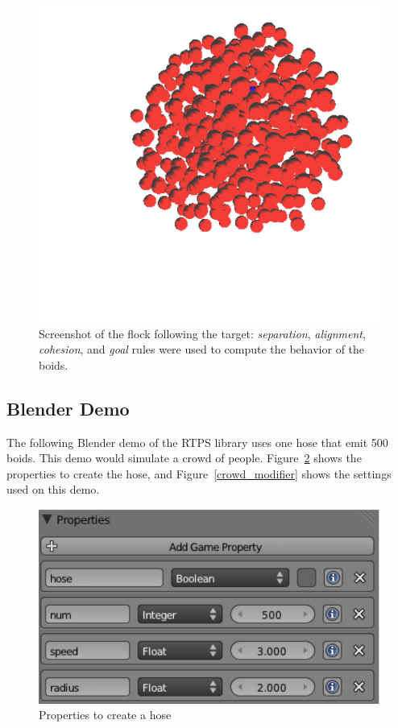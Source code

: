 \begin{figure}[htbp]
\begin{center}
\includegraphics[scale=0.35]{figures/demo_goal_4rules.pdf}
\caption{Screenshot of the flock following the target: \textit{separation}, \textit{alignment}, \textit{cohesion}, and \textit{goal} rules were used to compute the behavior of the boids.}
\label{goal_4rules}
\end{center}
\end{figure}

\subsection{Blender Demo}

The following Blender demo of the RTPS library uses one hose that emit 500 boids. This demo would simulate a crowd of people. Figure~\ref{crowd_prop} shows the properties to create the hose, and Figure~\ref{crowd_modifier} shows the settings used on this demo. 

\begin{figure}[htbp]
\begin{center}
\includegraphics[scale=0.7]{figures/demo_crowds_prop.pdf}
\caption{Properties to create a hose}
\label{crowd_prop}
\end{center}
\end{figure}

